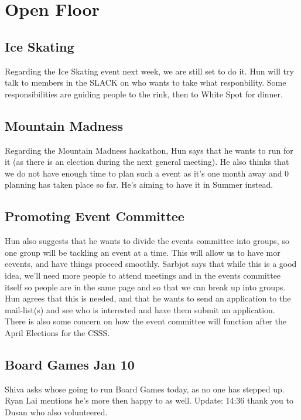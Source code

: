 \documentclass[12pt]{article}
\begin{document}
\section{Open Floor} \label{sec: Open}
\subsection{Ice Skating}
\noindent Regarding the Ice Skating event next week, we are still set to do it. Hun will try talk to members in the SLACK on who wants to take what responbility. Some responsibilities are guiding people to the rink, then to White Spot for dinner. \\

\subsection{Mountain Madness}
Regarding the Mountain Madness hackathon, Hun says that he wants to run for it (as there is an election during the next general meeting).  He also thinks that we do not have enough time to plan such a event as it's one month away and 0 planning has taken place so far. He's aiming to have it in Summer instead. \\

\subsection{Promoting Event Committee}
Hun also suggests that he wants to divide the events committee into groups, so one group will be tackling an event at a time. This will allow us to have mor eevents, and have things proceed smoothly. Sarbjot says that while this is a good idea, we'll need more people to attend meetings and in the events committee itself so people are in the same page and so that we can break up into groups. Hun agrees that this is needed, and that he wants to send an application to the mail-list(s) and see who is interested and have them submit an application.  \\

\noindent There is also some concern on how the event committee will function after the April Elections for the CSSS. 

\subsection{Board Games Jan 10}
Shiva asks whose going to run Board Games today, as no one has stepped up. Ryan Lai mentions he's more then happy to as well.
Update: 14:36 thank you to Dusan who also volunteered. 
\end{document}
